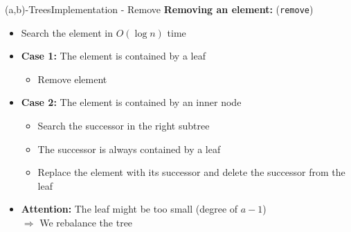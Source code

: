 
\begin{frame}{(a,b)-Trees}{Implementation - Remove}
  \textbf{Removing an element:} (\texttt{\color{MainA}remove})
  \begin{itemize}
    \item<2->
      Search the element in {\color{MainA}$O(\log n)$} time
    \item<3->
      \textbf{Case 1:}
      The element is contained by a leaf
      \begin{itemize}
        \item Remove element
      \end{itemize}
    \item<4->
      \textbf{Case 2:}
      The element is contained by an inner node
      \begin{itemize}
        \item<5->
          Search the {\color{MainA}successor} in the right subtree
        \item<6->
          The {\color{MainA}successor} is always contained by a leaf
        \item<7->
          Replace the element with its {\color{MainA}successor} and
          delete the {\color{MainA}successor} from the leaf
      \end{itemize}
    \item<8->
      \textbf{Attention:}
      The leaf might be too small (degree of {\color{MainA}$a-1$})\\
      $\Rightarrow$ We {\color{MainA}rebalance} the tree
  \end{itemize}
\end{frame}


